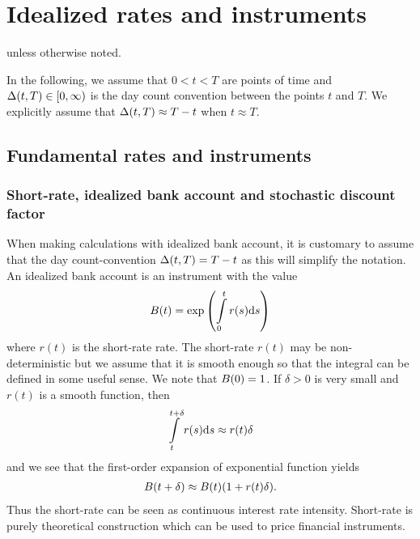 \chapter{Idealized rates and instruments}
\label{chap:instuments}

 \textcite[pp. 1--22]{brigo2007interest} unless otherwise noted.

In the following, we assume that $0 < t < T$ are points of time and $\Delta(t,T) \in [ 0, \infty )$ is the day count convention between the points $t$ and $T$. We explicitly assume that $\Delta(t,T) \approx T-t$ when $t \approx T$.

\section{Fundamental rates and instruments}

\subsection{Short-rate, idealized bank account and stochastic discount factor}

When making calculations with idealized bank account, it is customary to assume that the day count-convention $\Delta(t,T) = T-t$ as this will simplify the notation. An idealized bank account is an instrument with the value
\begin{align}
B(t) = \exp \left( \int\limits_0^t r(s) \mathrm{d} s \right)
\end{align}
where $r(t)$ is the short-rate rate. The short-rate $r(t)$ may be non-deterministic but we assume that it is smooth enough so that the integral can be defined in some useful sense. We note that $B(0)=1$. If $\delta > 0$ is very small and $r(t)$ is a smooth function, then 
\begin{align}
\int\limits_t^{t+\delta} r(s) \mathrm{d} s \approx r(t) \delta
\end{align}
and we see that the first-order expansion of exponential function yields
\begin{align}
B(t+\delta) \approx B(t) ( 1+r(t) \delta ) .
\end{align}
Thus the short-rate can be seen as continuous interest rate intensity. Short-rate is purely theoretical construction which can be used to price financial instruments. 

